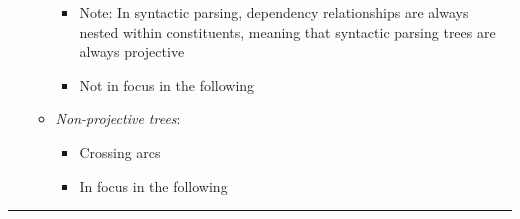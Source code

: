 \begin{itemize}
\begin{itemize}
\begin{itemize}
            \item Note: In syntactic parsing, dependency relationships are always nested within constituents, meaning that syntactic parsing trees are always projective
            \item Not in focus in the following
        \end{itemize}
        \item \emph{Non-projective trees}:
        \begin{itemize}
            \item Crossing arcs
            \item In focus in the following
        \end{itemize}
    \end{itemize}
\end{itemize}

{\color{lightgrey}\hrule height 0.001mm}

